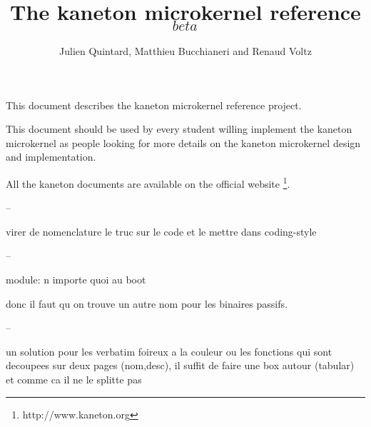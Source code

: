 
%
%



%
%

\rhead{}

%
%

\title{The kaneton microkernel reference $_{beta}$
       \logos}

%
%

\author{\small{Julien Quintard},
        \small{Matthieu Bucchianeri} and
        \small{Renaud Voltz}}

%
%



%
%

\maketitle

%
%

This document describes the kaneton microkernel reference project.

This document should be used by every student willing implement the
kaneton microkernel as people looking for more details on the kaneton
microkernel design and implementation.

All the kaneton documents are available on
the official website
  \footnote{http://www.kaneton.org}.

%
%

\tableofcontents

%
%














%
%






--

virer de nomenclature le truc sur le code et le mettre dans coding-style

--

module: n importe quoi au boot

donc il faut qu on trouve un autre nom pour les binaires passifs.

--

un solution pour les verbatim foireux a la couleur ou les fonctions
qui sont decoupees sur deux pages (nom,desc), il suffit de faire une
box autour (tabular) et comme ca il ne le splitte pas
